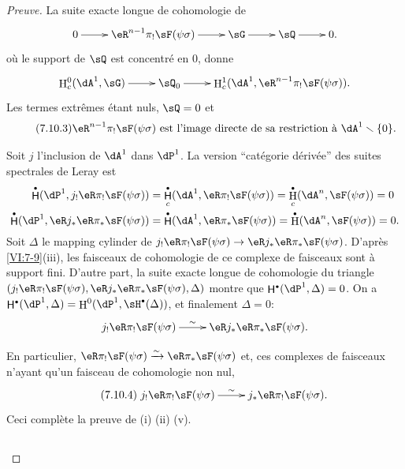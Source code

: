 \documentclass[oneside]{book}
\DeclareMathOperator{\h}{H}
\DeclareMathOperator{\hh}{\mathsf{H}} %
\newcommand{\iso}{\xrightarrow\sim}
\renewcommand{\setminus}{\smallsetminus}
\theoremstyle{sga-source}
\theoremstyle{sga-source-dash}
\theoremstyle{sga-source-dotdash}
\theoremstyle{sga-source-number-note-dash}
\theoremstyle{sga-source-note-number-dotdash}
\theoremstyle{sga-source-example-dotdash}
\theoremstyle{sga-source-inline-number}
\theoremstyle{sga-source-bare-number}
\theoremstyle{sga-source}
\let\oldbullet\bullet
\renewcommand{\bullet}{\textnormal{\tiny$\oldbullet$}}
\newcommand{\PrintPage}[1]{}\newcommand{\MathPage}[1]{}\newcommand{\PrintCite}[2]{#1}\newcommand{\var}[3]{#1}
\begin{document}
\begin{proof}[Preuve]
\PrintPage{223}
La suite exacte longue de cohomologie de 
\[\xymatrix{
  0 \ar[r] 
    & \eR^{n-1} \pi_! \sF(\psi\sigma) \ar[r] 
    & \sG \ar[r] 
    & \sQ \ar[r] 
    & 0 \text{.} 
}\]
où le support de $\sQ$ est concentré en $0$, donne 
\[\xymatrix{
  \h_c^0(\dA^1,\sG) \ar[r] 
    & \sQ_0 \ar[r] 
    & \h_c^1(\dA^1,\eR^{n-1} \pi_! \sF(\psi\sigma)) \text{.} 
}\]
Les termes extrêmes étant nuls, $\sQ=0$ et 
\begin{equation*}\tag{7.10.3}\label{VI:eq:7-10-3}
  \text{$\eR^{n-1} \pi_! \sF(\psi\sigma)$ est l'image directe de sa restriction à $\dA^1\setminus \{0\}$.}
\end{equation*}

Soit $j$ l'inclusion de $\dA^1$ dans $\dP^1$. La version ``catégorie 
dérivée'' des suites spectrales de Leray est 
\begin{align*}
  \hh^\bullet(\dP^1,j_! \eR\pi_! \sF(\psi\sigma)) &= \hh_c^\bullet(\dA^1,\eR \pi_! \sF(\psi\sigma)) = \h_c^\bullet(\dA^n,\sF(\psi\sigma)) = 0 \\
  \hh^\bullet(\dP^1,\eR j_\ast \eR \pi_\ast \sF(\psi\sigma)) &= \hh^\bullet(\dA^1,\eR \pi_\ast \sF(\psi\sigma)) = \h^\bullet(\dA^n,\sF(\psi\sigma)) = 0 \text{.}
\end{align*}
Soit $\Delta$ le mapping cylinder de 
$j_! \eR\pi_! \sF(\psi\sigma) \to \eR j_\ast \eR \pi_\ast \sF(\psi\sigma)$. 
D'après \ref{VI:7-9}(iii), les faisceaux de cohomologie de ce complexe de 
faisceaux sont à support fini. D'autre part, la suite exacte longue de 
cohomologie du triangle 
$(j_!\eR \pi_! \sF(\psi\sigma),\eR j_\ast \eR \pi_\ast \sF(\psi\sigma),\Delta)$ 
montre que $\hh^\bullet(\dP^1,\Delta)=0$. On a 
$\hh^\bullet(\dP^1,\Delta) = \h^0(\dP^1,\sH^\bullet(\Delta))$, et finalement 
$\Delta=0$: 
\[\xymatrix{
  j_! \eR\pi_! \sF(\psi\sigma) \ar[r]^-\sim 
    & \eR j_\ast \eR \pi_\ast \sF(\psi\sigma) \text{.} 
}\]

En particulier, $\eR\pi_! \sF(\psi\sigma)\iso \eR\pi_\ast \sF(\psi\sigma)$ et, 
ces complexes de faisceaux n'ayant qu'un faisceau de cohomologie non nul, 
\begin{equation*}\tag{7.10.4}\label{VI:eq:7-10-4}
\xymatrix{
  j_! \eR \pi_! \sF(\psi\sigma) \ar[r]^-\sim 
    & j_\ast \eR \pi_! \sF(\psi\sigma) \text{.} 
}
\end{equation*}
Ceci complète la preuve de (i) (ii) (v). 





\PrintPage{224}
\subsection{}\label{VI:7-11}


\end{proof}
\end{document}
